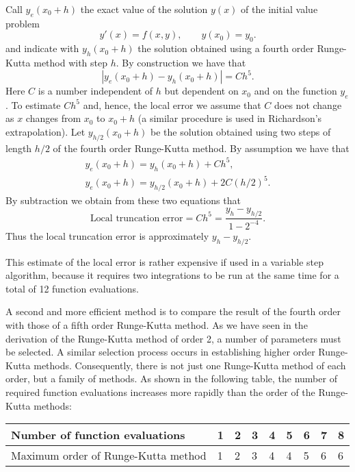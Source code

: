 Call $y_e(x_0+h)$ the exact value of the solution $y(x)$ of the
initial value problem
%
\begin{equation}
  y'(x) = f(x,y) , \qquad y(x_0) = y_0 .
\end{equation}
%
and indicate with $y_h(x_0+h)$ the solution obtained using a fourth
order Runge-Kutta method with step $h$.  By construction we have that
%
\begin{equation}
  |y_e(x_0+h) - y_h(x_0+h)| = C h^5.
  \label{IVP.eq:41}
\end{equation}
%
Here $C$ is a number independent of $h$ but dependent on $x_0$ and on
the function $y_e$.  To estimate $C h^5$ and, hence, the local error
we assume that $C$ does not change as $x$ changes from $x_0$ to $x_0 +
h$ (a similar procedure is used in Richardson's extrapolation).  Let
$y_{h/2}(x_0+h)$ be the solution obtained using two steps of length
$h/2$ of the fourth order Runge-Kutta method.  By assumption we have
that
%
\begin{equation}
  \begin{array}{l}
    y_e(x_0+h) = y_{h}(x_0+h) + C h^5 , \\
    y_e(x_0+h) = y_{h/2}(x_0+h) + 2 C (h/2)^5 .
  \end{array}
  \label{IVP.eq:42}
\end{equation}
%
By subtraction we obtain from these two equations that
%
\begin{equation}
  \text{Local truncation error} = C h^5 =
  \frac{y_h - y_{h/2}}{1-2^{-4}} .
  \label{IVP.eq:43}
\end{equation}
%
Thus the local truncation error is approximately $y_h - y_{h/2}$.

This estimate of the local error is rather expensive if used in a
variable step algorithm, because it requires two integrations to be
run at the same time for a total of 12 function evaluations.

A second and more efficient method is to compare the result of the
fourth order with those of a fifth order Runge-Kutta method.  As we
have seen in the derivation of the Runge-Kutta method of order 2, a
number of parameters must be selected.  A similar selection process
occurs in establishing higher order Runge-Kutta methods.
Consequently, there is not just one Runge-Kutta method of each order,
but a family of methods.  As shown in the following table, the number
of required function evaluations increases more rapidly than the order
of the Runge-Kutta methods:

\begin{center}
  \begin{tabular}{l|llllllll}
    Number of function evaluations & 1 & 2 & 3 & 4 & 5 & 6 & 7 & 8 \\ \hline
    Maximum order of Runge-Kutta method & 1 & 2 & 3 & 4 & 4 & 5 & 6 & 6
  \end{tabular}
\end{center}

